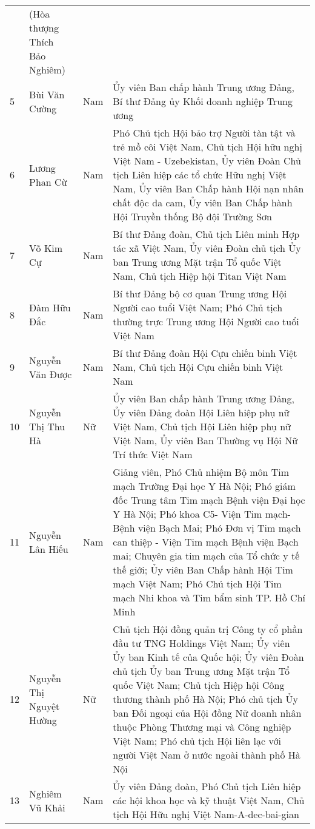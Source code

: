 \begin{longtable}{p{}p{}p{}p{}}
 &
  (Hòa thượng Thích Bảo Nghiêm) &
 &
 \\
5 &
  Bùi Văn Cường &
  Nam &
  Ủy viên Ban chấp hành Trung ương Đảng, Bí thư Đảng ủy Khối doanh nghiệp Trung ương \\
6 &
  Lương Phan Cừ &
  Nam &
  Phó Chủ tịch Hội bảo trợ Người tàn tật và trẻ mồ côi Việt Nam, Chủ tịch Hội hữu nghị Việt Nam - Uzebekistan, Ủy viên Đoàn Chủ tịch Liên hiệp các tổ chức Hữu nghị Việt Nam, Ủy viên Ban Chấp hành Hội nạn nhân chất độc da cam, Ủy viên Ban Chấp hành Hội Truyền thống Bộ đội Trường Sơn \\
7 &
  Võ Kim Cự &
  Nam &
  Bí thư Đảng đoàn, Chủ tịch Liên minh Hợp tác xã Việt Nam, Ủy viên Đoàn chủ tịch Ủy ban Trung ương Mặt trận Tổ quốc Việt Nam, Chủ tịch Hiệp hội Titan Việt Nam \\
8 &
  Đàm Hữu Đắc &
  Nam &
  Bí thư Đảng bộ cơ quan Trung ương Hội Người cao tuổi Việt Nam; Phó Chủ tịch thường trực Trung ương Hội Người cao tuổi Việt Nam \\
9 &
  Nguyễn Văn Được &
  Nam &
  Bí thư Đảng đoàn Hội Cựu chiến binh Việt Nam, Chủ tịch Hội Cựu chiến binh Việt Nam \\
10 &
  Nguyễn Thị Thu Hà &
  Nữ &
  Ủy viên Ban chấp hành Trung ương Đảng, Ủy viên Đảng đoàn Hội Liên hiệp phụ nữ Việt Nam, Chủ tịch Hội Liên hiệp phụ nữ Việt Nam, Ủy viên Ban Thường vụ Hội Nữ Trí thức Việt Nam \\
11 &
  Nguyễn Lân Hiếu &
  Nam &
  Giảng viên, Phó Chủ nhiệm Bộ môn Tim mạch Trường Đại học Y Hà Nội; Phó giám đốc Trung tâm Tim mạch Bệnh viện Đại học Y Hà Nội; Phó khoa C5- Viện Tim mạch-Bệnh viện Bạch Mai; Phó Đơn vị Tim mạch can thiệp - Viện Tim mạch Bệnh viện Bạch mai; Chuyên gia tim mạch của Tổ chức y tế thế giới; Ủy viên Ban Chấp hành Hội Tim mạch Việt Nam; Phó Chủ tịch Hội Tim mạch Nhi khoa và Tim bẩm sinh TP. Hồ Chí Minh \\
12 &
  Nguyễn Thị Nguyệt Hường &
  Nữ &
  Chủ tịch Hội đồng quản trị Công ty cổ phần đầu tư TNG Holdings Việt Nam; Ủy viên Ủy ban Kinh tế của Quốc hội; Ủy viên Đoàn chủ tịch Ủy ban Trung ương Mặt trận Tổ quốc Việt Nam; Chủ tịch Hiệp hội Công thương thành phố Hà Nội; Phó chủ tịch Ủy ban Đối ngoại của Hội đồng Nữ doanh nhân thuộc Phòng Thương mại và Công nghiệp Việt Nam; Phó chủ tịch Hội liên lạc với người Việt Nam ở nước ngoài thành phố Hà Nội \\
13 &
  Nghiêm Vũ Khải &
  Nam &
  Ủy viên Đảng đoàn, Phó Chủ tịch Liên hiệp các hội khoa học và kỹ thuật Việt Nam, Chủ tịch Hội Hữu nghị Việt Nam-A-dec-bai-gian \\

\end{longtable}
